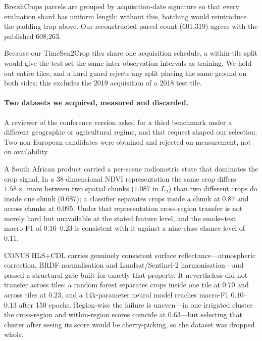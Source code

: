 \documentclass[journal]{IEEEtran}
\begin{document}
BreizhCrops parcels are grouped by acquisition-date signature so that every
evaluation shard has uniform length; without this, batching would reintroduce
the padding trap above. Our reconstructed parcel count (601{,}319) agrees with
the published 608{,}263.

Because our TimeSen2Crop tiles share one acquisition schedule, a within-tile
split would give the test set the same inter-observation intervals as training.
We hold out entire tiles, and a hard guard rejects any split placing the same
ground on both sides; this excludes the 2019 acquisition of a 2018 test tile.

\paragraph{Two datasets we acquired, measured and discarded.}
A reviewer of the conference version asked for a third benchmark under a
different geographic or agricultural regime, and that request shaped our
selection. Two non-European candidates were obtained and rejected on
measurement, not on availability.

A South African product carried a per-scene radiometric state that dominates the
crop signal. In a 38-dimensional NDVI representation the same crop differs
$1.58\times$ more between two spatial chunks ($1.087$ in $L_2$) than two
different crops do inside one chunk ($0.687$); a classifier separates crops
inside a chunk at $0.87$ and across chunks at $0.095$. Under that representation
cross-region transfer is not merely hard but unavailable at the stated feature
level, and the smoke-test macro-F1 of $0.16$--$0.23$ is consistent with it
against a nine-class chance level of $0.11$.

CONUS HLS+CDL carries genuinely consistent surface reflectance---atmospheric
correction, BRDF normalisation and Landsat/Sentinel-2 harmonisation---and
passed a structural gate built for exactly that property. It nevertheless did
not transfer across tiles: a random forest separates crops inside one tile at
$0.70$ and across tiles at $0.23$, and a 14k-parameter neural model reaches
macro-F1 $0.10$--$0.13$ after 150 epochs. Region-wise the failure is uneven---in
one irrigated cluster the cross-region and within-region scores coincide at
$0.63$---but selecting that cluster after seeing its score would be
cherry-picking, so the dataset was dropped whole.
\end{document}
